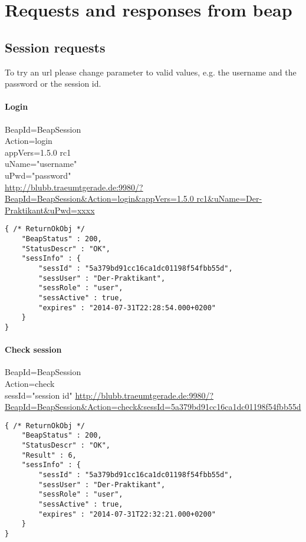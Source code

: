 \documentclass[12pt,a4paper,oneside]{report}
\begin{document}
\printbibliography
%

\appendix
\chapter{Requests and responses from beap}
\lstset{language=JavaScript}
\section{Session requests}
To try an url please change parameter to valid values, e.g. the username and the password or the session id.
\subsubsection{Login}
BeapId=BeapSession\\
Action=login\\
appVers=1.5.0 rc1\\
uName="username"\\
uPwd="password"\\
\url{http://blubb.traeumtgerade.de:9980/?BeapId=BeapSession&Action=login&appVers=1.5.0 rc1&uName=Der-Praktikant&uPwd=xxxx}
\lstset{language=JavaScript}
\begin{lstlisting}
{ /* ReturnOkObj */
    "BeapStatus" : 200,
    "StatusDescr" : "OK",
    "sessInfo" : { 
        "sessId" : "5a379bd91cc16ca1dc01198f54fbb55d",
        "sessUser" : "Der-Praktikant",
        "sessRole" : "user",
        "sessActive" : true,
        "expires" : "2014-07-31T22:28:54.000+0200"
    }
}
\end{lstlisting}
\clearpage
\subsubsection{Check session}
BeapId=BeapSession\\
Action=check\\
sessId="session id"
\url{http://blubb.traeumtgerade.de:9980/?BeapId=BeapSession&Action=check&sessId=5a379bd91cc16ca1dc01198f54fbb55d}
\lstset{language=JavaScript}
\begin{lstlisting}
{ /* ReturnOkObj */
    "BeapStatus" : 200,
    "StatusDescr" : "OK",
    "Result" : 6,
    "sessInfo" : { 
        "sessId" : "5a379bd91cc16ca1dc01198f54fbb55d",
        "sessUser" : "Der-Praktikant",
        "sessRole" : "user",
        "sessActive" : true,
        "expires" : "2014-07-31T22:32:21.000+0200"
    }
}
\end{lstlisting}
\end{document}
